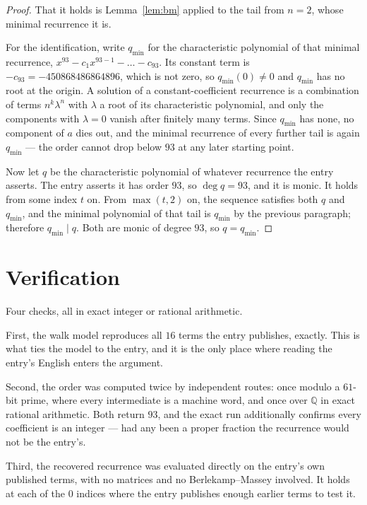 \documentclass[11pt,a4paper]{article}
\theoremstyle{plain}
\theoremstyle{definition}
\begin{document}
\begin{proof}
That it holds is Lemma~\ref{lem:bm} applied to the tail from $n=2$, whose minimal
recurrence it is.

For the identification, write $q_{\min}$ for the characteristic polynomial of that minimal
recurrence, $x^{93}-c_1x^{93-1}-\dots-c_{93}$. Its constant term is
$-c_{93}=-450868486864896$, which is not zero, so $q_{\min}(0)\neq0$ and $q_{\min}$ has no
root at the origin. A solution of a constant-coefficient recurrence is a combination of terms
$n^{k}\lambda^{n}$ with $\lambda$ a root of its characteristic polynomial, and only the
components with $\lambda=0$ vanish after finitely many terms. Since $q_{\min}$ has none, no
component of $a$ dies out, and the minimal recurrence of every further tail is again
$q_{\min}$ --- the order cannot drop below $93$ at any later starting point.

Now let $q$ be the characteristic polynomial of whatever recurrence the entry asserts. The
entry asserts it has order $93$, so $\deg q=93$, and it is monic. It holds from some
index $t$ on. From $\max(t,2)$ on, the sequence satisfies both $q$ and $q_{\min}$, and
the minimal polynomial of that tail is $q_{\min}$ by the previous paragraph; therefore
$q_{\min}\mid q$. Both are monic of degree $93$, so $q=q_{\min}$.
\end{proof}

\section{Verification}

Four checks, all in exact integer or rational arithmetic.

First, the walk model reproduces all $16$ terms the entry publishes, exactly. This is
what ties the model to the entry, and it is the only place where reading the entry's English
enters the argument.

Second, the order was computed twice by independent routes: once modulo a $61$-bit prime, where
every intermediate is a machine word, and once over $\mathbb{Q}$ in exact rational arithmetic.
Both return $93$, and the exact run additionally confirms every coefficient is an integer
--- had any been a proper fraction the recurrence would not be the entry's.

Third, the recovered recurrence was evaluated directly on the entry's own published terms, with
no matrices and no Berlekamp--Massey involved. It holds at each of the $0$ indices where
the entry publishes enough earlier terms to test it.
\end{document}
